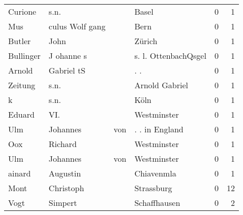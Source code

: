 \begin{center}
\begin{tiny}
\begin{longtabu}{llllrr}
                  Curione &                               s.n. &             &                                       Basel &          0 &         1 \\
                      Mus &                    culus Wolf gang &             &                                        Bern &          0 &         1 \\
                   Butler &                               John &             &                                      Zürich &          0 &         1 \\
                Bullinger &                         J ohanne s &             &                        s. l. OttenbachQsgel &          0 &         1 \\
                   Arnold &                         Gabriel tS &             &                                        . .  &          0 &         1 \\
                  Zeitung &                               s.n. &             &                              Arnold Gabriel &          0 &         1 \\
                        k &                               s.n. &             &                                        Köln &          0 &         1 \\
                   Eduard &                                VI. &             &                                 Westminster &          0 &         1 \\
                      Ulm &                           Johannes &         von &                              . . in England &          0 &         1 \\
                      Oox &                            Richard &             &                                 Westminster &          0 &         1 \\
                      Ulm &                           Johannes &         von &                                 Westminster &          0 &         1 \\
                   ainard &                           Augustin &             &                                  Chiavenmla &          0 &         1 \\
                     Mont &                          Christoph &             &                                  Strassburg &          0 &        12 \\
                     Vogt &                            Simpert &             &                                Schaffhausen &          0 &         2 \\

\end{longtabu}
\end{tiny}
\end{center}

